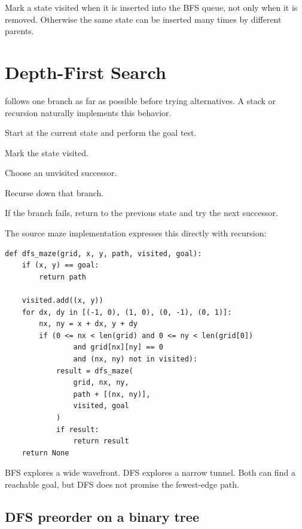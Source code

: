 \begin{pitfall}
Mark a state visited when it is inserted into the BFS queue, not only when it is removed. Otherwise the same state can be inserted many times by different parents.
\end{pitfall}

\section{Depth-First Search}

 follows one branch as far as possible before trying alternatives. A stack or recursion naturally implements this behavior.

\begin{mlsteps}
  \item Start at the current state and perform the goal test.
  \item Mark the state visited.
  \item Choose an unvisited successor.
  \item Recurse down that branch.
  \item If the branch fails, return to the previous state and try the next successor.
\end{mlsteps}

The source maze implementation expresses this directly with recursion:

\begin{lstlisting}[style=mlpython]
def dfs_maze(grid, x, y, path, visited, goal):
    if (x, y) == goal:
        return path

    visited.add((x, y))
    for dx, dy in [(-1, 0), (1, 0), (0, -1), (0, 1)]:
        nx, ny = x + dx, y + dy
        if (0 <= nx < len(grid) and 0 <= ny < len(grid[0])
                and grid[nx][ny] == 0
                and (nx, ny) not in visited):
            result = dfs_maze(
                grid, nx, ny,
                path + [(nx, ny)],
                visited, goal
            )
            if result:
                return result
    return None
\end{lstlisting}

\begin{intuition}
BFS explores a wide wavefront. DFS explores a narrow tunnel. Both can find a reachable goal, but DFS does not promise the fewest-edge path.
\end{intuition}

\subsection{DFS preorder on a binary tree}


